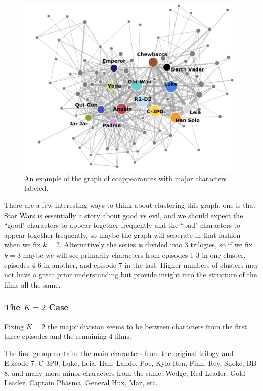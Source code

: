 \documentclass[12pt]{article} \usepackage[utf8]{inputenc}
\begin{document}
\begin{figure}
    \centering
    \includegraphics[scale=0.5]{graph-ex.png}
    \caption{An example of the graph of coappearances with major characters labeled.}
    \label{fig: graph}
\end{figure}

There are a few interesting ways to think about clustering this graph, one is that Star Wars is essentially a story about good vs evil, and we should expect the ``good" characters to appear together frequently and the ``bad" characters to appear together frequently, so maybe the graph will seperate in that fashion when we fix $k=2$. Alternatively the series is divided into 3 trilogies, so if we fix $k=3$ maybe we will see primarily characters from episodes 1-3 in one cluster, episodes 4-6 in another, and episode 7 in the last. Higher numbers of clusters may not have a great prior understanding but provide insight into the structure of the films all the same.

\subsubsection*{The $K=2$ Case}

Fixing $K=2$ the major division seems to be between characters from the first three episodes and the remaining 4 films.

The first group contains the main characters from the original trilogy and Episode 7: C-3P0, Luke, Leia, Han, Lando, Poe, Kylo Ren, Finn, Rey, Snoke, BB-8, and many more minor characters from the same: Wedge, Red Leader, Gold Leader, Captain Phasma, General Hux, Maz, etc.
\end{document}
